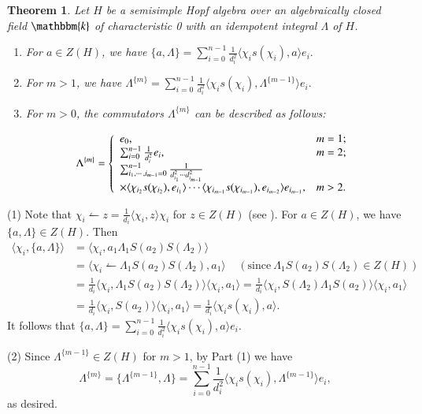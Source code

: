 \documentclass[11pt]{amsart}
\newtheorem{thm}{Theorem}[section]
\numberwithin{equation}{section}
\begin{document}
\begin{thm}\label{t2}
Let $H$ be a semisimple Hopf algebra over an algebraically closed field $\mathbbm{k}$ of characteristic 0 with an idempotent integral $\Lambda$ of $H$. 
\begin{enumerate}
\item For $a\in Z(H)$, we have $\{a,\Lambda\}=\sum_{i=0}^{n-1}\frac{1}{d_i^2}\langle\chi_is(\chi_i),a\rangle e_i.$
\item For $m>1$, we have $\Lambda^{\{m\}}=\sum_{i=0}^{n-1}\frac{1}{d_i^2}\langle\chi_is(\chi_i),\Lambda^{\{m-1\}}\rangle e_i.$
\item For $m>0$, the commutators $\Lambda^{\{m\}}$ can be described as follows:

$$\Lambda^{\{m\}}=\left\{
    \begin{array}{ll}
      e_0, & \hbox{$m=1$;} \\
      \sum_{i=0}^{n-1}\frac{1}{d_i^2}e_i, & \hbox{$m=2$;} \\
      \sum_{i_1,\cdots,i_{m-1}=0}^{n-1}\frac{1}{d^2_{i_1}\cdots d^2_{i_{m-1}}}\\ \times\langle\chi_{i_2}s(\chi_{i_2}),e_{i_1}\rangle\cdots \langle\chi_{i_{m-1}}s(\chi_{i_{m-1}}),e_{i_{m-2}}\rangle e_{i_{m-1}}, & \hbox{$m>2$.}
    \end{array}
  \right.
$$
\end{enumerate}
\end{thm}
\proof
(1) Note that $\chi_i\leftharpoonup z=\frac{1}{d_i}\langle\chi_i,z\rangle\chi_i$ for $z\in Z(H)$ (see \cite[Eq.(13)]{CW}). For $a\in Z(H)$, we have $\{a,\Lambda\}\in Z(H)$. Then
\begin{align*}
\langle\chi_i,\{a,\Lambda\}\rangle&=\langle\chi_i,a_1\Lambda_1S(a_2)S(\Lambda_2)\rangle\\
&=\langle\chi_i\leftharpoonup \Lambda_1S(a_2)S(\Lambda_2),a_1\rangle\ \ \ \ \ (\text{since}\  \Lambda_1S(a_2)S(\Lambda_2)\in Z(H))\\
&=\frac{1}{d_i}\langle\chi_i,\Lambda_1S(a_2)S(\Lambda_2)\rangle\langle\chi_i,a_1\rangle
=\frac{1}{d_i}\langle\chi_i,S(\Lambda_2)\Lambda_1S(a_2)\rangle\langle\chi_i,a_1\rangle\\
&=\frac{1}{d_i}\langle\chi_i,S(a_2)\rangle\langle\chi_i,a_1\rangle
=\frac{1}{d_i}\langle\chi_is(\chi_i),a\rangle.
\end{align*}
It follows that $\{a,\Lambda\}=\sum_{i=0}^{n-1}\frac{1}{d^2_i}\langle\chi_is(\chi_i),a\rangle e_i.$

(2) Since $\Lambda^{\{m-1\}}\in Z(H)$ for $m>1$, by Part (1) we have $$\Lambda^{\{m\}}=\{\Lambda^{\{m-1\}},\Lambda\}=\sum_{i=0}^{n-1}\frac{1}{d_i^2}\langle\chi_is(\chi_i),\Lambda^{\{m-1\}}\rangle e_i,$$  as desired. 
\end{document}
